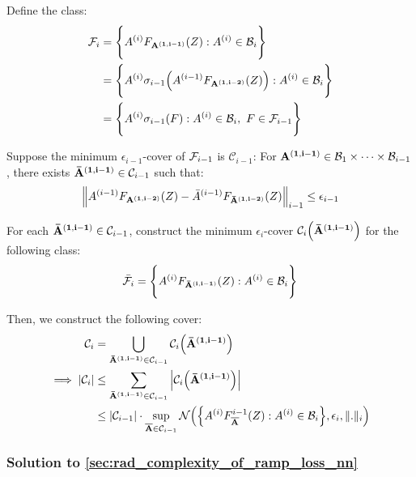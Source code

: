 \begin{proof*}
    
    \noindent Define the class:
    \begin{align*}
        \mathcal{F}_i &= \Bigg\{ 
            A^{(i)}F_{\bf A^{(1, i-1)}}(Z) : A^{(i)} \in \mathcal{B}_i        
         \Bigg\} \\
        &= \Bigg\{ 
            A^{(i)}\sigma_{i-1}\Big( 
                A^{(i-1)}F_{\bf A^{(1, i-2)}}(Z)
             \Big) : A^{(i)} \in \mathcal{B}_i
         \Bigg\} \\
        &= \Bigg\{ 
            A^{(i)}\sigma_{i-1}(F): A^{(i)} \in \mathcal{B}_i, \ F \in \mathcal{F}_{i-1}
         \Bigg\}
    \end{align*}


    \noindent Suppose the minimum $\epsilon_{i-1}$-cover of $\mathcal{F}_{i-1}$ is $\mathcal{C}_{i-1}$: For ${\bf A^{(1, i-1)}}\in\mathcal{B}_1\times\dots\times\mathcal{B}_{i-1}$, there exists ${\bf {\bar A}^{(1,i-1)}} \in \mathcal{C}_{i-1}$ such that:
    \begin{align*}
        \Big\| A^{(i-1)}F_{\bf A^{(1, i-2)}}(Z) - {\bar A}^{(i-1)}F_{\bf {\bar A}^{(1, i-2)}}(Z)\Big\|_{i-1} \le \epsilon_{i-1}
    \end{align*}

    \noindent For each ${\bf {\bar A}^{(1, i-1)}}\in\mathcal{C}_{i-1}$, construct the minimum $\epsilon_i$-cover $\mathcal{C}_i\Big( {\bf {\bar A}^{(1,i-1)}} \Big)$ for the following class:
    \begin{align*}
        \bar {\mathcal{F}}_i = \Bigg\{ A^{(i)}F_{\bf {\bar A}^{(i, i-1)}}(Z):A^{(i)}\in\mathcal{B}_i \Bigg\}
    \end{align*}
    
    \noindent Then, we construct the following cover:
    \begin{align*}
        \mathcal{C}_i &= \bigcup_{{\bf {\bar A}^{(1, i-1)}}\in\mathcal{C}_{i-1}}\mathcal{C}_i \Big( {\bf {\bar A}^{(1, i-1)}} \Big)
        \\
        \implies 
        |\mathcal{C}_i| &\le \sum_{{\bf {\bar A}^{(1, i-1)}}\in\mathcal{C}_{i-1}}\Big|
            \mathcal{C}_i \Big( {\bf {\bar A}^{(1, i-1)}} \Big)
        \Big| \\
        &\le |\mathcal{C}_{i-1}|\cdot\sup_{{\bf \overline{A}}\in\mathcal{C}_{i-1}} \mathcal{N}\Big( 
            \Big\{ 
                A^{(i)}F^{i-1}_{\bf \overline{A}}(Z):A^{(i)}\in\mathcal{B}_i
             \Big\}, \epsilon_i, \|.\|_i
         \Big)
    \end{align*}
\end{proof*}


\subsubsection{Solution to \ref{sec:rad_complexity_of_ramp_loss_nn}}

